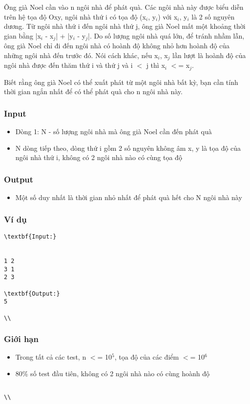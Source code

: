 

Ông già Noel cần vào n ngôi nhà để phát quà. Các ngôi nhà này được biểu diễn trên hệ tọa độ Oxy, ngôi nhà thứ i có tọa độ (x$_i$, y$_i$) với x$_i$, y$_i$ là 2 số nguyên dương. Từ ngôi nhà thứ i đến ngôi nhà thứ j, ông già Noel mất một khoảng thời gian bằng |x$_i$ - x$_j$| + |y$_i$ - y$_j$|. Do số lượng ngôi nhà quá lớn, để tránh nhầm lẫn, ông già Noel chỉ đi đến ngôi nhà có hoành độ không nhỏ hơn hoành độ của những ngôi nhà đến trước đó. Nói cách khác, nếu x$_i$, x$_j$ lần lượt là hoành độ của ngôi nhà được đến thăm thứ i và thứ j và i $<$ j thì x$_i$ $<$= x$_j$.

Biết rằng ông già Noel có thể xuất phát từ một ngôi nhà bất kỳ, bạn cần tính thời gian ngắn nhất để có thể phát quà cho n ngôi nhà này.

\subsubsection{Input}
\begin{itemize}
	\item Dòng 1: N - số lượng ngôi nhà mà ông già Noel cần đến phát quà
	\item N dòng tiếp theo, dòng thứ i gồm 2 số nguyên không âm x, y là tọa độ của ngôi nhà thứ i, không có 2 ngôi nhà nào có cùng tọa độ
\end{itemize}

\subsubsection{Output}
\begin{itemize}
	\item Một số duy nhất là thời gian nhỏ nhất để phát quà hết cho N ngôi nhà này
\end{itemize}

\subsubsection{Ví dụ}
\begin{verbatim}
\textbf{Input:}


1 2
3 1
2 3

\textbf{Output:}
5

\\\end{verbatim}

\subsubsection{Giới hạn}
\begin{itemize}
	\item Trong tất cả các test, n $<$= 10$^5$, tọa độ của các điểm $<$= 10$^6$
	\item 80\% số test đầu tiên, không có 2 ngôi nhà nào có cùng hoành độ
\end{itemize}
\begin{verbatim}

\\\end{verbatim}
